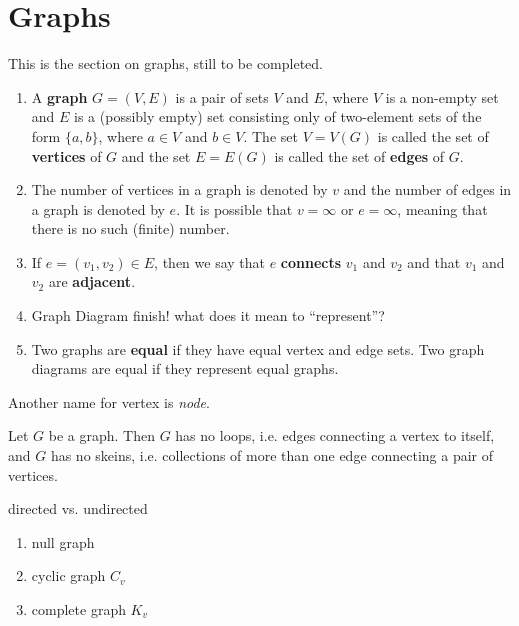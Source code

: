 \section{Graphs}\label{sec:graphs}

This is the section on graphs, still to be completed.

\begin{definition}
\begin{enumerate}
    \item \label{def:graph} A \textbf{graph} $G=(V, E)$ is a pair of sets $V$ and $E$, where $V$ is a non-empty set and $E$ is a (possibly empty) set consisting only of two-element sets of the form $\{a, b\}$, where $a \in V$ and $b \in V$.  The set $V=V(G)$ is called the set of \textbf{vertices} of $G$ and the set $E=E(G)$ is called the set of \textbf{edges} of $G$.
    \item The number of vertices in a graph is denoted by $v$ and the number of edges in a graph is denoted by $e$.  It is possible that $v=\infty$ or $e=\infty$, meaning that there is no such (finite) number.
    \item If $e=(v_1, v_2)\in E$, then we say that $e$ \textbf{connects} $v_1$ and $v_2$ and that $v_1$ and $v_2$ are \textbf{adjacent}.
    \item Graph Diagram {\color{red} finish! what does it mean to ``represent''?}
    \item Two graphs are \textbf{equal} if they have equal vertex and edge sets.  Two graph diagrams are equal if they represent equal graphs.
\end{enumerate}
\end{definition}

Another name for vertex is \textit{node}.

\begin{lemma} Let $G$ be a graph.  Then $G$ has no \textnormal{loops, i.e.} edges connecting a vertex to itself, and $G$ has no \textnormal{skeins, i.e.} collections of more than one edge connecting a pair of vertices.
\end{lemma}

{\color{red} directed vs. undirected}

\begin{example}
    \begin{enumerate}
        \item null graph
        \item cyclic graph $C_v$
        \item complete graph $K_v$
    \end{enumerate}
\end{example}

